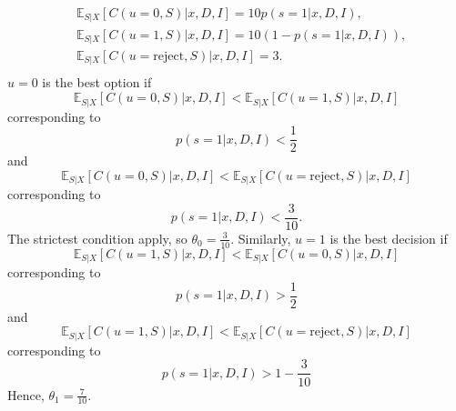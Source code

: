 \begin{example}
\begin{enumerate}
		\begin{equation}
			\begin{split}
				&\mathbb{E}_{S|X}[C(u=0, S)|x,D,I] = 10 p(s=1|x,D,I),\\
				&\mathbb{E}_{S|X}[C(u=1, S)|x,D,I] = 10(1-p(s=1|x,D,I)),\\
				&\mathbb{E}_{S|X}[C(u= \text{reject}, S)|x,D,I] = 3.\\
			\end{split}
		\end{equation}
		$u=0$ is the best option if
		\begin{equation}
			\mathbb{E}_{S|X}[C(u=0, S)|x,D,I] <\mathbb{E}_{S|X}[C(u=1, S)|x,D,I]
		\end{equation}
		corresponding to 
		\begin{equation}
			p(s=1|x,D,I)<\frac{1}{2}
		\end{equation}
		and 
		\begin{equation}
			\mathbb{E}_{S|X}[C(u=0, S)|x,D,I] <\mathbb{E}_{S|X}[C(u=\text{reject}, S)|x,D,I]
		\end{equation}
		corresponding to 
		\begin{equation}
			p(s=1|x,D,I)<\frac{3}{10}.
		\end{equation}
		The strictest condition apply, so $\theta_0=\frac{3}{10}$. Similarly, $u=1$ is the best decision if 
		\begin{equation}
			\mathbb{E}_{S|X}[C(u=1, S)|x,D,I] <\mathbb{E}_{S|X}[C(u=0, S)|x,D,I]
		\end{equation}
		corresponding to
		\begin{equation}
			p(s=1|x,D,I)>\frac{1}{2}
		\end{equation}
		and 
		\begin{equation}
			\mathbb{E}_{S|X}[C(u=1, S)|x,D,I] <\mathbb{E}_{S|X}[C(u=\text{reject}, S)|x,D,I]
		\end{equation}
		corresponding to 
		\begin{equation}
			p(s=1|x,D,I)> 1-\frac{3}{10}
		\end{equation}
		Hence, $\theta_1= \frac{7}{10}$.
	\end{enumerate}
\end{example}